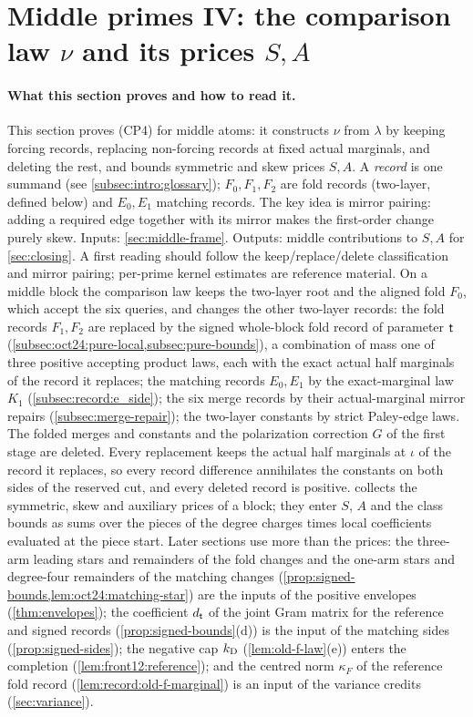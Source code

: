 

\section{Middle primes IV: the comparison law \texorpdfstring{$\nu$}{nu} and its prices \texorpdfstring{$S,A$}{S,A}}
\label{sec:middle-records}

\paragraph{What this section proves and how to read it.}
This section proves (CP4) for middle atoms: it constructs $\nu$
from $\lambda$ by keeping forcing records, replacing non-forcing
records at fixed actual marginals, and deleting the rest, and
bounds symmetric and skew prices $S,A$. A \emph{record} is one
summand (see \cref{subsec:intro:glossary}); $F_0,F_1,F_2$ are fold
records (two-layer, defined below) and $E_0,E_1$ matching records.
The key idea is mirror pairing: adding a required edge together
with its mirror makes the first-order change purely skew. Inputs:
\cref{sec:middle-frame}. Outputs: middle contributions to $S,A$
for \cref{sec:closing}. A first reading should follow the
keep/replace/delete classification and mirror pairing; per-prime
kernel estimates are reference material.
On a middle block the comparison law
keeps the two-layer root and the aligned fold $F_0$, which accept the six
queries, and changes the other two-layer records: the fold records $F_1,F_2$
are replaced by the signed whole-block fold record of parameter $\mathsf t$
(\cref{subsec:oct24:pure-local,subsec:pure-bounds}), a combination of mass one
of three positive accepting product laws, each with the exact actual half
marginals of the record it replaces; the matching records $E_0,E_1$ by the
exact-marginal law $K_1$ (\cref{subsec:record:e_side}); the six merge records
by their actual-marginal mirror repairs (\cref{subsec:merge-repair}); the
two-layer constants by strict Paley-edge laws. The folded merges and
constants and the polarization correction $G$ of the first stage are
deleted. Every replacement keeps the actual half marginals at
$\iota$ of the record it replaces, so every record difference annihilates the
constants on both sides of the reserved cut, and every deleted record is
positive.  collects the symmetric, skew and
auxiliary prices of a block; they enter $S$, $A$ and the class bounds as sums
over the pieces of the degree charges times local coefficients evaluated at
the piece start. Later sections use more than the prices: the three-arm
leading stars and remainders of the fold changes and the one-arm stars and
degree-four remainders of the matching changes
(\cref{prop:signed-bounds,lem:oct24:matching-star}) are the inputs of the
positive envelopes (\cref{thm:envelopes}); the coefficient
$d_\mathsf t$ of the joint Gram matrix for the reference and signed
records (\cref{prop:signed-bounds}(d)) is the input of the matching sides
(\cref{prop:signed-sides}); the negative cap $k_{\rm D}$
(\cref{lem:old-f-law}(e)) enters the completion
(\cref{lem:front12:reference}); and the centred norm $\kappa_F$ of the
reference fold record (\cref{lem:record:old-f-marginal}) is an input of the
variance credits (\cref{sec:variance}).


